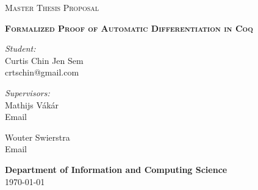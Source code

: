 \documentclass[a4, 12pt]{article}
\begin{document}
\begin{titlepage}

\begin{figure}
   \begin{minipage}{0.48\textwidth}
   \begin{flushleft}
   \end{flushleft}
   \end{minipage}\hfill
   \begin{minipage}{0.48\textwidth}
   \begin{flushright}
   \end{flushright}
   \end{minipage}
\end{figure}

\thispagestyle{fancy}

\vspace{1in}

\center

\textsc{\large Master Thesis Proposal}

\vspace{0.5in}

\noindent\makebox[\linewidth]{\rule{\linewidth}{1.2pt}}
\textsc{ \textbf{\large Formalized Proof of Automatic Differentiation in Coq }}
\noindent\makebox[\linewidth]{\rule{\linewidth}{1.2pt}}

\vspace{0.5in}

\begin{minipage}{0.48\textwidth}
    \begin{flushleft}
        \textit{Student:} \\
        Curtis Chin Jen Sem \\
        crtschin@gmail.com
    \end{flushleft}
\end{minipage}
\begin{minipage}{0.48\textwidth}
    \begin{flushright}
    \textit{Supervisors:} \\
    Mathijs V\'{a}k\'{a}r \\
    Email
    \end{flushright}
    \begin{flushright}
    Wouter Swierstra \\
    Email
    \end{flushright}
\end{minipage}

\vspace{2in}

\textbf{\large Department of Information and Computing Science} \\

\today

\end{titlepage}
\end{document}
